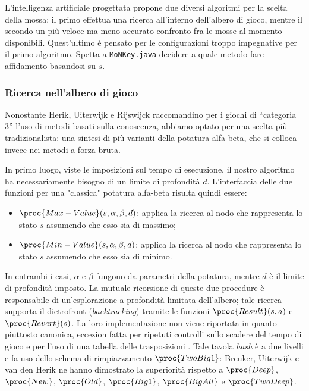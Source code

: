 \documentclass{article}
\begin{document}
L'intelligenza artificiale progettata propone due diversi algoritmi per la
scelta della mossa: il primo effettua una ricerca all'interno dell'albero di
gioco, mentre il secondo un più veloce ma meno accurato confronto fra le mosse
al momento disponibili. Quest'ultimo è pensato per le configurazioni troppo
impegnative per il primo algoritmo. Spetta a \verb!MoNKey.java! decidere a quale
metodo fare affidamento basandosi su $s$.

\subsubsection{Ricerca nell'albero di gioco}

Nonostante Herik, Uiterwijk e Rijswijck \cite{VANDENHERIK2002277} raccomandino
per i giochi di ``categoria 3'' l'uso di metodi basati sulla conoscenza,
abbiamo optato per una scelta più tradizionalista: una sintesi di più varianti
della potatura alfa-beta, che si colloca invece nei metodi a forza bruta.

\begin{sloppypar}
In primo luogo, viste le imposizioni sul tempo di esecuzione, il nostro
algoritmo ha necessariamente bisogno di un limite di profondità $d$.
L'interfaccia delle due funzioni per una "classica" potatura alfa-beta
\cite{at.UBO029034619980101.200--202} risulta quindi essere:
\end{sloppypar}
\begin{itemize}
  \item $\proc{Max-Value}(s, \alpha, \beta, d)$: applica la ricerca
    al nodo che rappresenta lo stato $s$ assumendo che esso sia di massimo;
  \item $\proc{Min-Value}(s, \alpha, \beta, d)$: applica la ricerca
    al nodo che rappresenta lo stato $s$ assumendo che esso sia di minimo.
\end{itemize}
In entrambi i casi, $\alpha$ e $\beta$ fungono da parametri della potatura,
mentre $d$ è il limite di profondità imposto. La mutuale ricorsione di queste
due procedure è responsabile di un'esplorazione a profondità limitata
dell'albero; tale ricerca supporta il dietrofront
\cite{at.UBO029034619980101.108} (\emph{backtracking}) tramite le funzioni
$\proc{Result}(s, a)$ e $\proc{Revert}(s)$.
La loro implementazione non viene riportata in quanto piuttosto canonica,
eccezion fatta per ripetuti controlli sullo scadere del tempo di gioco e per
l'uso di una tabella delle trasposizioni \cite{CN020689428}. Tale tavola
\emph{hash} è a due livelli e fa uso dello schema di rimpiazzamento
$\proc{TwoBig1}$: Breuker, Uiterwijk e van den Herik
\cite{BREUKER-UITERWIJK-VANDENHERIK}
\cite{edsdbl.journals.icga.BreukerUH9619960101} ne hanno dimostrato la
superiorità rispetto a $\proc{Deep}$, $\proc{New}$, $\proc{Old}$, $\proc{Big1}$,
$\proc{BigAll}$ e $\proc{TwoDeep}$.
\end{document}
